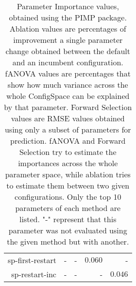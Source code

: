\begin{table}
\begin{tabular}{r|r|r|r|r}
sp-first-restart            &                 - &                 - & $          0.060$ &                 -\\
sp-restart-inc              &                 - &                 - &                 - & $          0.046$\\
\bottomrule
\end{tabular}
\caption{Parameter Importance values, obtained using the PIMP package. Ablation values are percentages of improvement a single parameter change obtained between the default and an incumbent configuration.
fANOVA values are percentages that show how much variance across the whole ConfigSpace can be explained by that parameter.
Forward Selection values are RMSE values obtained using only a subset of parameters for prediction.
fANOVA and Forward Selection try to estimate the importances across the whole parameter space, while ablation tries to estimate them between two given configurations.
Only the top 10 parameters of each method are listed.
                    "-" represent that this parameter was not evaluated
                     using the given method but with another.
                    }
\label{tab:pimp}
\end{table}

